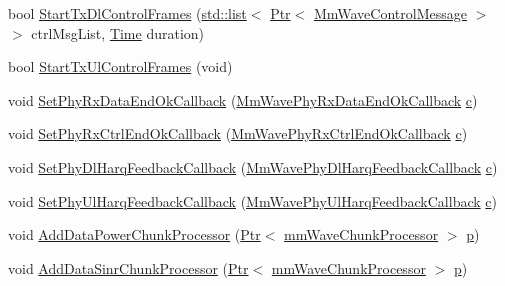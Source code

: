 \begin{DoxyCompactItemize}
\item 
bool \hyperlink{classns3_1_1MmWaveSpectrumPhy_a7bb863c3358b96a78bc4354f2ebbe3f4}{Start\+Tx\+Dl\+Control\+Frames} (\hyperlink{openflow-interface_8h_afd9bcfa176617760671b67580f536fa7}{std\+::list}$<$ \hyperlink{classns3_1_1Ptr}{Ptr}$<$ \hyperlink{classns3_1_1MmWaveControlMessage}{Mm\+Wave\+Control\+Message} $>$ $>$ ctrl\+Msg\+List, \hyperlink{classns3_1_1Time}{Time} duration)
\item 
bool \hyperlink{classns3_1_1MmWaveSpectrumPhy_acfcaccddd3c565d200c0fd4897d134e5}{Start\+Tx\+Ul\+Control\+Frames} (void)
\item 
void \hyperlink{classns3_1_1MmWaveSpectrumPhy_a372c344e4967b99e5816b9a6374607a0}{Set\+Phy\+Rx\+Data\+End\+Ok\+Callback} (\hyperlink{namespacens3_a3d4932dc40c714b73714c65a086bd622}{Mm\+Wave\+Phy\+Rx\+Data\+End\+Ok\+Callback} \hyperlink{mmwave_2model_2fading-traces_2fading__trace__generator_8m_ae0323a9039add2978bf5b49550572c7c}{c})
\item 
void \hyperlink{classns3_1_1MmWaveSpectrumPhy_affe15182ed0e347f2b87180951da51fd}{Set\+Phy\+Rx\+Ctrl\+End\+Ok\+Callback} (\hyperlink{namespacens3_a147e86a90da3cd02d30b6a913cb786d6}{Mm\+Wave\+Phy\+Rx\+Ctrl\+End\+Ok\+Callback} \hyperlink{mmwave_2model_2fading-traces_2fading__trace__generator_8m_ae0323a9039add2978bf5b49550572c7c}{c})
\item 
void \hyperlink{classns3_1_1MmWaveSpectrumPhy_a49ea887c1413254ff05d73a7d4420b4b}{Set\+Phy\+Dl\+Harq\+Feedback\+Callback} (\hyperlink{namespacens3_af2838cfd552cb02b768db1c514cdbc80}{Mm\+Wave\+Phy\+Dl\+Harq\+Feedback\+Callback} \hyperlink{mmwave_2model_2fading-traces_2fading__trace__generator_8m_ae0323a9039add2978bf5b49550572c7c}{c})
\item 
void \hyperlink{classns3_1_1MmWaveSpectrumPhy_a8438a20b2973d0e5f8c3532b96869628}{Set\+Phy\+Ul\+Harq\+Feedback\+Callback} (\hyperlink{namespacens3_ad991c5321b1aedfbb27717057c344ac9}{Mm\+Wave\+Phy\+Ul\+Harq\+Feedback\+Callback} \hyperlink{mmwave_2model_2fading-traces_2fading__trace__generator_8m_ae0323a9039add2978bf5b49550572c7c}{c})
\item 
void \hyperlink{classns3_1_1MmWaveSpectrumPhy_a9c890033ad643e265a5f1f06c87a2d08}{Add\+Data\+Power\+Chunk\+Processor} (\hyperlink{classns3_1_1Ptr}{Ptr}$<$ \hyperlink{classns3_1_1mmWaveChunkProcessor}{mm\+Wave\+Chunk\+Processor} $>$ \hyperlink{lte__link__budget__x2__handover__measures_8m_ac9de518908a968428863f829398a4e62}{p})
\item 
void \hyperlink{classns3_1_1MmWaveSpectrumPhy_a5700f3ca71be250d5df323ba36c51cc8}{Add\+Data\+Sinr\+Chunk\+Processor} (\hyperlink{classns3_1_1Ptr}{Ptr}$<$ \hyperlink{classns3_1_1mmWaveChunkProcessor}{mm\+Wave\+Chunk\+Processor} $>$ \hyperlink{lte__link__budget__x2__handover__measures_8m_ac9de518908a968428863f829398a4e62}{p})

\end{DoxyCompactItemize}
